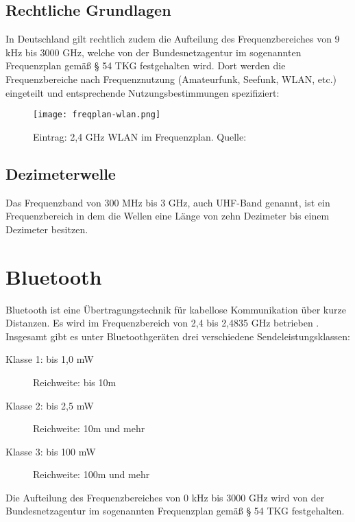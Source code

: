 \subsection{Rechtliche Grundlagen} %
In Deutschland gilt rechtlich zudem die Aufteilung des Frequenzbereiches von 9 kHz bis 3000 GHz, welche von der Bundesnetzagentur im sogenannten Frequenzplan \cite[Bundesnetzagentur, 2016]{bundesnetzagentur-frequenzplan:2016} gemäß § 54 TKG festgehalten wird.
Dort werden die Frequenzbereiche nach Frequenznutzung (Amateurfunk, Seefunk, WLAN, etc.) eingeteilt und entsprechende Nutzungsbestimmungen spezifiziert:

\begin{figure}[ht]
	\centering
	\texttt{[image: freqplan-wlan.png]}
	\caption[Eintrag: 2,4 GHz WLAN im Frequenzplan]{Eintrag: 2,4 GHz WLAN im Frequenzplan. Quelle: \cite[Bundesnetzagentur, 2016]{bundesnetzagentur-frequenzplan:2016}}
	\label{frequenzplan-wlan}
\end{figure}

\subsection{Dezimeterwelle}
Das Frequenzband von 300 MHz bis 3 GHz, auch \ac{UHF}-Band genannt, ist ein Frequenzbereich in dem die Wellen eine Länge von zehn Dezimeter bis einem Dezimeter besitzen.

\section{Bluetooth}
Bluetooth ist eine Übertragungstechnik für kabellose Kommunikation über kurze Distanzen. Es wird im Frequenzbereich von 2,4 bis 2,4835 GHz betrieben \cite[Bundesamt für Strahlenschutz, S. 1]{bundesamt-strahlungsschutz:2012}. Insgesamt gibt es unter Bluetoothgeräten drei verschiedene Sendeleistungsklassen:
\begin{description}
	\item[Klasse 1: bis 1,0 mW] Reichweite: bis 10m 
	\item [Klasse 2: bis 2,5 mW] Reichweite: 10m und mehr
	\item [Klasse 3: bis 100 mW] Reichweite: 100m und mehr
\end{description}
Die Aufteilung des Frequenzbereiches von 0 kHz bis 3000 GHz wird von der Bundesnetzagentur im sogenannten Frequenzplan \cite[Bundesnetzagentur]{bundesnetzagentur-frequenzplan:2016} gemäß § 54 TKG festgehalten.

